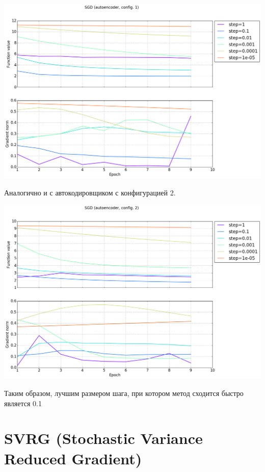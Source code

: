 \documentclass[12pt, a4paper]{article}
\begin{document}
    \begin{center}\includegraphics[width=\picwidth]{sgd_autoencoder_conf1.png}\end{center}

    Аналогично и с автокодировщиком с конфигурацией 2.

    \begin{center}\includegraphics[width=\picwidth]{sgd_autoencoder_conf2.png}\end{center}

    Таким образом, лучшим размером шага, при котором метод сходится быстро является 0.1


    \section{SVRG (Stochastic Variance Reduced Gradient)}
\end{document}
